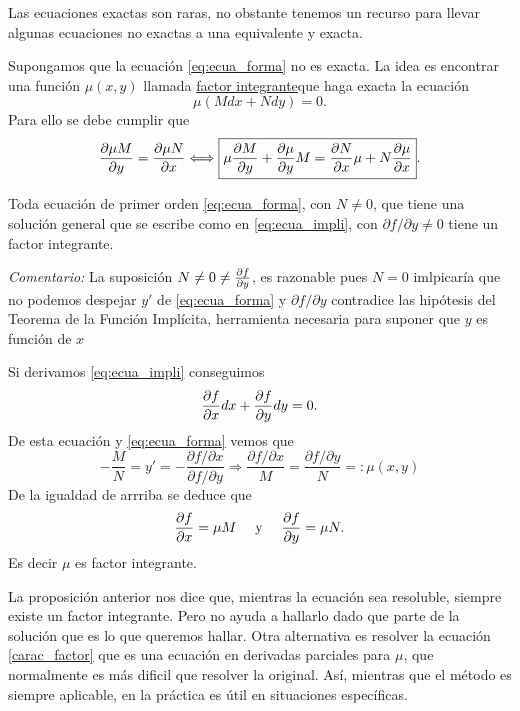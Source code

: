  Las ecuaciones exactas son raras, no obstante tenemos un recurso para llevar algunas ecuaciones no exactas a una equivalente y exacta.

 Supongamos que la ecuación  \eqref{eq:ecua_forma} no es  exacta. La idea es encontrar una función $\mu(x,y)$ llamada
\href{http://es.wikipedia.org/wiki/Ecuación_diferencial_exacta\#Factor_integrante.}{factor integrante}\link que haga exacta la ecuación
\[\mu\left(Mdx+Ndy\right)=0.\]
 Para ello se debe cumplir que
\begin{equation}\label{carac_factor}
  \der{\mu M}{y}=\der{\mu N}{x}\Longleftrightarrow \boxed{ \mu\der{M}{y}+\der{\mu}{y}M=\der{N}{x}\mu+N\der{\mu}{x}}.
\end{equation}

\begin{proposicion} Toda ecuación de primer
 orden \eqref{eq:ecua_forma}, con $N\neq 0$,  que tiene una solución general
que se escribe como en \eqref{eq:ecua_impli}, con $\partial f/\partial y\neq 0
$  tiene un factor integrante.
\end{proposicion}
\noindent\textit{Comentario:} La suposición $N\neq 0 \neq\der{f}{y}$,  es razonable pues $N=0$ imlpicaría que no podemos despejar $y'$ de \eqref{eq:ecua_forma}  y $\partial f/\partial y$ contradice las hipótesis del Teorema de la Función Implícita, herramienta necesaria para suponer que $y$ es función de $x$

\begin{demo} Si derivamos \eqref{eq:ecua_impli} conseguimos
\[\der{f}{x}dx+\der{f}{y}dy=0.\]
De esta ecuación y \eqref{eq:ecua_forma}  vemos que
\[-\frac{M}{N}=y'=-\frac{\partial f /\partial x}{\partial f/\partial y}\Longrightarrow \frac{ \partial f /\partial x}{M}=\frac{ \partial f/\partial y}{N}=:\mu(x,y)\]
 De la igualdad de arrriba se deduce que
\[\der{f}{x}=\mu M\quad\text{ y }\quad \der{f}{y}=\mu N.\]
Es decir $\mu$ es factor integrante.
\end{demo}

La proposición anterior nos dice que, mientras la ecuación sea resoluble, siempre  existe un factor integrante. Pero no ayuda a hallarlo dado que parte de la solución que es lo que queremos hallar. Otra alternativa es resolver la ecuación \eqref{carac_factor} que es una ecuación en derivadas parciales para $\mu$, que normalmente es más dificil que resolver  la original. Así, mientras que el método es siempre aplicable, en la práctica es útil en situaciones específicas.

